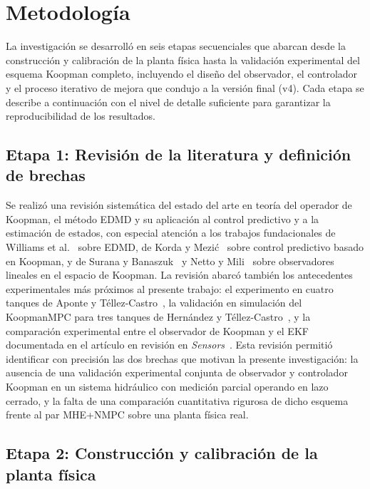 \documentclass[12pt,letterpaper]{article}
\begin{document}
\section{Metodología}
\label{sec:metodologia}

La investigación se desarrolló en seis etapas secuenciales que abarcan 
desde la construcción y calibración de la planta física hasta la 
validación experimental del esquema Koopman completo, incluyendo el 
diseño del observador, el controlador y el proceso iterativo de mejora 
que condujo a la versión final (v4). Cada etapa se describe a 
continuación con el nivel de detalle suficiente para garantizar la 
reproducibilidad de los resultados.

\subsection{Etapa 1: Revisión de la literatura y definición de brechas}

Se realizó una revisión sistemática del estado del arte en teoría del 
operador de Koopman, el método EDMD y su aplicación al control 
predictivo y a la estimación de estados, con especial atención a los 
trabajos fundacionales de Williams et al.~\cite{williams2015} sobre 
EDMD, de Korda y Mezić~\cite{korda2018} sobre control predictivo basado 
en Koopman, y de Surana y Banaszuk~\cite{surana2016} y Netto y 
Mili~\cite{netto2020} sobre observadores lineales en el espacio de 
Koopman. La revisión abarcó también los antecedentes experimentales más 
próximos al presente trabajo: el experimento en cuatro tanques de Aponte 
y Téllez-Castro~\cite{aponte2024}, la validación en simulación del 
KoopmanMPC para tres tanques de Hernández y 
Téllez-Castro~\cite{hernandez2026}, y la comparación experimental entre 
el observador de Koopman y el EKF documentada en el artículo en revisión 
en \textit{Sensors}~\cite{hernandez2025sensors}. Esta revisión permitió 
identificar con precisión las dos brechas que motivan la presente 
investigación: la ausencia de una validación experimental conjunta de 
observador y controlador Koopman en un sistema hidráulico con medición 
parcial operando en lazo cerrado, y la falta de una comparación 
cuantitativa rigurosa de dicho esquema frente al par MHE+NMPC sobre una 
planta física real.

\subsection{Etapa 2: Construcción y calibración de la planta física}
\label{sec:planta_fisica}
\end{document}
